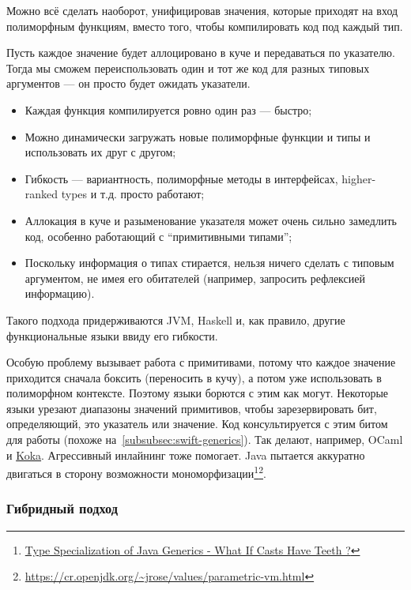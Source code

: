 Можно всё сделать наоборот, унифицировав значения, которые приходят на вход полиморфным функциям, вместо того, чтобы компилировать код под каждый тип.

Пусть каждое значение будет аллоцировано в куче и передаваться по указателю.
Тогда мы сможем переиспользовать один и тот же код для разных типовых аргументов --- он просто будет ожидать указатели.

\begin{itemize}
    \item[\positive] Каждая функция компилируется ровно один раз --- быстро;
    \item[\positive] Можно динамически загружать новые полиморфные функции и типы и использовать их друг с другом;
    \item[\positive] Гибкость --- вариантность, полиморфные методы в интерфейсах, higher-ranked types и т.д. просто работают;
    \item[\negative] Аллокация в куче и разыменование указателя может очень сильно замедлить код, особенно работающий с ``примитивными типами'';
    \item[\negative] Поскольку информация о типах стирается, нельзя ничего сделать с типовым аргументом, не имея его обитателей (например, запросить рефлексией информацию).
\end{itemize}

Такого подхода придерживаются JVM, Haskell и, как правило, другие функциональные языки ввиду его гибкости.

Особую проблему вызывает работа с примитивами, потому что каждое значение приходится сначала боксить (переносить в кучу), а потом уже использовать в полиморфном контексте.
Поэтому языки борются с этим как могут.
Некоторые языки урезают диапазоны значений примитивов, чтобы зарезервировать бит, определяющий, это указатель или значение.
Код консультируется с этим битом для работы (похоже на~\ref{subsubsec:swift-generics}).
Так делают, например, OCaml и \href{https://koka-lang.github.io/koka/doc/book.html#sec-value-types}{Koka}.
Агрессивный инлайнинг тоже помогает.
Java пытается аккуратно двигаться в сторону возможности мономорфизации\footnote{\href{https://youtu.be/JI09cs2yUgY?si=MLkRs31mN1koXIu1}{Type Specialization of Java Generics - What If Casts Have Teeth ?}}\footnote{\url{https://cr.openjdk.org/~jrose/values/parametric-vm.html}}.

\subsubsection{Гибридный подход} \label{subsubsec:hybrid}

